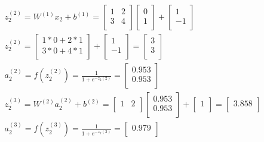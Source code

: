 \documentclass[leqno]{article}
\begin{document}
\begin{gather*}
\begin{split}
&z_2^{(2)} = W^{(1)}x_2 + b^{(1)} =
  \begin{bmatrix}
  1 & 2\\
  3 & 4\\ 
  \end{bmatrix}
  \begin{bmatrix}
  0\\
  1\\ 
  \end{bmatrix}
  +
 \begin{bmatrix}
  1\\
  -1\\ 
  \end{bmatrix}
\\
&z_2^{(2)} = 
  \begin{bmatrix}
  1*0 + 2*1\\
  3*0 + 4*1\\ 
  \end{bmatrix}
  +
 \begin{bmatrix}
  1\\
  -1\\ 
  \end{bmatrix}
=
 \begin{bmatrix}
  3\\
  3\\ 
  \end{bmatrix}
\\
&a_2^{(2)} = f(z_2^{(2)}) = \frac{1}{1 + e^{-z_2{(2)}}} =
 \begin{bmatrix}
   0.953\\
   0.953\\ 
  \end{bmatrix}
\\
&z_2^{(3)} = W^{(2)}a_2^{(2)} + b^{(2)} =
 \begin{bmatrix}
   1 & 2\\
  \end{bmatrix}
 \begin{bmatrix}
   0.953\\
   0.953\\ 
  \end{bmatrix} 
  +
   \begin{bmatrix}
   1\\
  \end{bmatrix}
  =
 \begin{bmatrix}
   3.858\\ 
  \end{bmatrix}
\\
&a_2^{(3)} = f(z_2^{(3)}) = \frac{1}{1 + e^{-z_2{(3)}}} =
 \begin{bmatrix}
   0.979\\ 
  \end{bmatrix}
\end{split}
\end{gather*}
\end{document}
